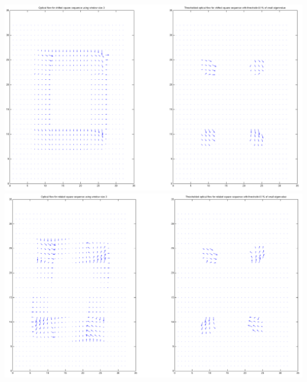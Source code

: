 \documentclass{article}
\begin{document}
\newline\newline\newline\newline\newline
\includegraphics[width=7.5in]{2c.png}
\newpage
\includegraphics[width=7.5in]{2d.png}
\end{document}
